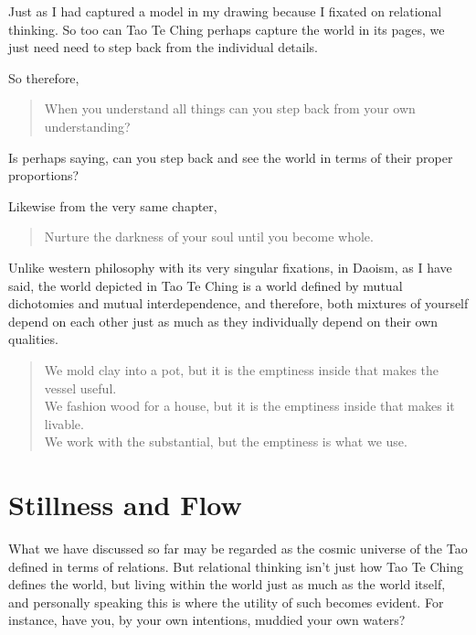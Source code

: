 Just as I had captured a model in my drawing because I fixated on relational thinking. So too can Tao Te Ching perhaps capture the world in its pages, we just need need to step back from the individual details.

So therefore,
\begin{verse}
When you understand all things can you step back from your own understanding?\\
\end{verse}

\newpage

Is perhaps saying, can you step back and see the world in terms of their proper proportions?

Likewise from the very same chapter, 

\begin{verse}
Nurture the darkness of your soul until you become whole.\\
\end{verse}

Unlike western philosophy with its very singular fixations, in Daoism, as I have said, the world depicted in Tao Te Ching is a world defined by mutual dichotomies and mutual interdependence, and therefore, both mixtures of yourself depend on each other just as much as they individually depend on their own qualities. 

\begin{verse}
We mold clay into a pot, but it is the emptiness inside that makes the vessel useful.\\
We fashion wood for a house, but it is the emptiness inside that makes it livable.\\
We work with the substantial, but the emptiness is what we use.\\
\end{verse}

\section{Stillness and Flow}

What we have discussed so far may be regarded as the cosmic universe of the Tao defined in terms of relations. But relational thinking isn’t just how Tao Te Ching defines the world, but living within the world just as much as the world itself, and personally speaking this is where the utility of such becomes evident. For instance, have you, by your own intentions, muddied your own waters?

